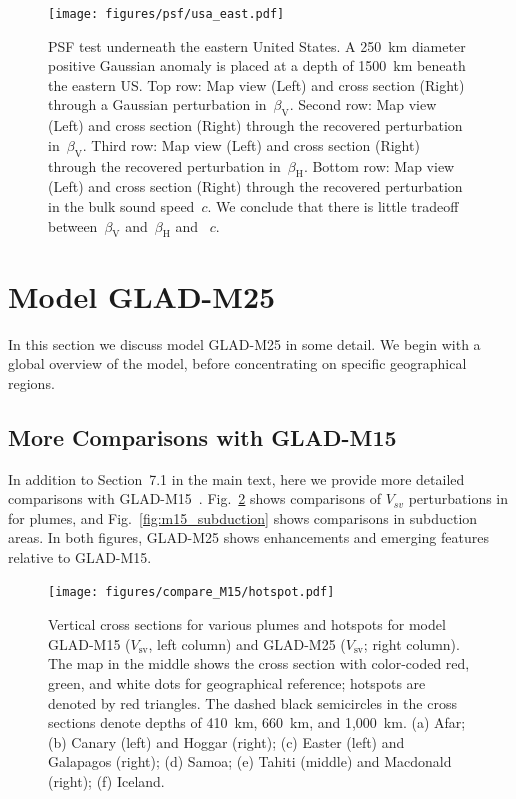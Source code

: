 \documentclass[extra,mreferee]{gji}
\begin{document}
\begin{figure}
  \centering
  \texttt{[image: figures/psf/usa\_east.pdf]}
  \caption{\small{PSF test underneath the eastern United States.
    A 250~km diameter positive Gaussian anomaly is placed at a depth of 1500~km beneath the eastern US.
  Top row: Map view (Left) and cross section (Right) through a Gaussian perturbation in~$\beta_\mathrm{V}$.
  Second row: Map view (Left) and cross section (Right) through the recovered perturbation in~$\beta_\mathrm{V}$.
  Third row: Map view (Left) and cross section (Right) through the recovered perturbation in~$\beta_\mathrm{H}$.
  Bottom row: Map view (Left) and cross section (Right) through the recovered perturbation in the bulk sound speed~$c$. We conclude that there is little tradeoff between~$\beta_\mathrm{V}$ and~$\beta_\mathrm{H}$ and ~$c$.
  }}
  \label{fig:psf_usa_east}
\end{figure}


\section{Model GLAD-M25}
\label{section:model}

In this section we discuss model GLAD-M25 in some detail.
We begin with a global overview of the model, before concentrating on
specific geographical regions.

\subsection{More Comparisons with GLAD-M15}

In addition to Section~7.1 in the main text, here we provide more detailed comparisons with GLAD-M15~\citep{bozdaug2016global}. Fig.~\ref{fig:m15_hotspot} shows comparisons of $V_{sv}$ perturbations in for plumes, and Fig.~\ref{fig:m15_subduction} shows comparisons in subduction areas. In both figures, GLAD-M25 shows enhancements and emerging features relative to GLAD-M15.

\begin{figure}
  \centering
  \texttt{[image: figures/compare\_M15/hotspot.pdf]}
  \caption{\small{Vertical cross sections for various plumes and hotspots for model GLAD-M15 ($V_\textrm{sv}$, left column) and GLAD-M25 ($V_\textrm{sv}$; right column).
  The map in the middle shows the cross section with color-coded red, green, and white dots for geographical reference; hotspots are denoted by red triangles.
  The dashed black semicircles in the cross sections denote depths of 410~km, 660~km, and 1,000~km.
  (a) Afar; (b) Canary (left) and Hoggar (right); (c) Easter (left) and Galapagos (right); (d) Samoa; (e) Tahiti (middle) and Macdonald (right); (f) Iceland.
  }}
  \label{fig:m15_hotspot}
\end{figure}
\end{document}
